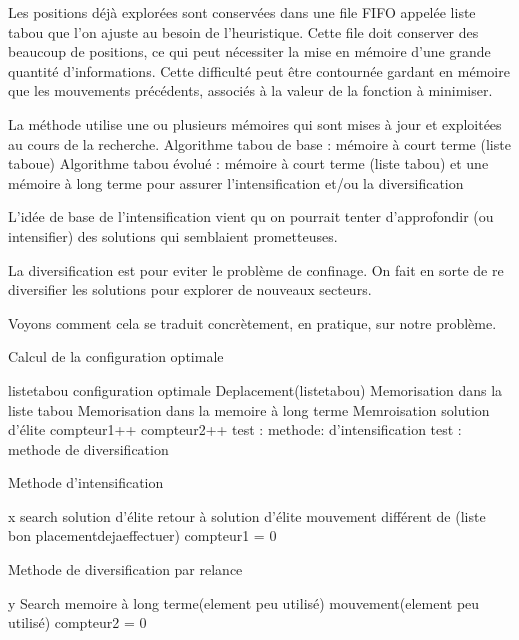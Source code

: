 \documentclass{report}
\begin{document}
Les positions déjà explorées sont conservées dans une file FIFO appelée  liste tabou  que l'on ajuste au besoin de l'heuristique. Cette file doit conserver des beaucoup de positions, ce qui peut  nécessiter la mise en mémoire d'une grande quantité d'informations. Cette difficulté peut être contournée gardant en mémoire que les mouvements précédents, associés à la valeur de la fonction à minimiser.

La méthode utilise une ou plusieurs mémoires  qui sont mises à jour
et exploitées au cours de la recherche.
Algorithme tabou de base : mémoire à court terme (liste taboue)
Algorithme tabou évolué : mémoire à court terme (liste tabou) et une mémoire à
long terme pour assurer l’intensification et/ou la diversification

L'idée de base de l'intensification vient qu on pourrait tenter d'approfondir (ou intensifier) des solutions qui semblaient prometteuses.

La diversification est pour eviter le problème de confinage. On fait en sorte de re diversifier les solutions pour explorer de nouveaux secteurs.

Voyons comment cela se traduit concrètement, en pratique, sur notre problème.

\begin{algorithm}
\caption{Calcul de la configuration optimale}
\begin{algorithmic}
\REQUIRE listetabou
\ENSURE configuration optimale
\STATE Deplacement(listetabou)
\STATE Memorisation dans la liste tabou
\STATE Memorisation dans la memoire à long terme
\STATE Memroisation solution d'élite
\STATE compteur1++
\STATE compteur2++
\STATE test : methode: d'intensification
\STATE test : methode de diversification
\ENDWHILE
\end{algorithmic}
\end{algorithm}

\begin{algorithm}
\caption{Methode d'intensification}
\begin{algorithmic}
\REQUIRE x
\ENSURE 
{}
\STATE search solution d'élite
\STATE retour à solution d'élite
\STATE mouvement différent de (liste bon placementdejaeffectuer)
\ENDIF
\STATE compteur1 = 0
\end{algorithmic}
\end{algorithm}

\begin{algorithm}
\caption{Methode de diversification par relance}
\begin{algorithmic}
\REQUIRE y
\ENSURE 
{}
\STATE Search memoire à long terme(element peu utilisé)
\STATE mouvement(element peu utilisé)
\ENDIF
\STATE compteur2 = 0
\end{algorithmic}
\end{algorithm}
\end{document}
